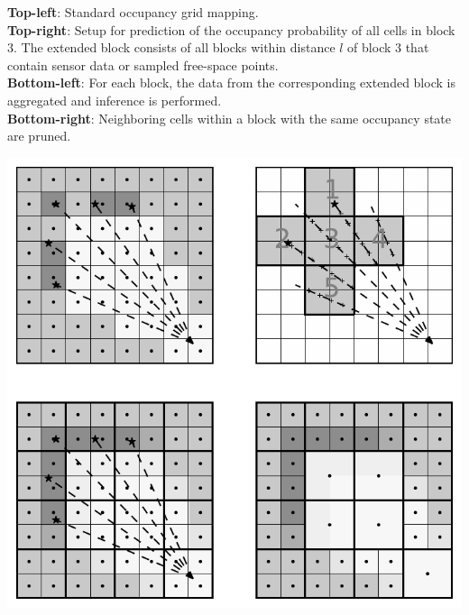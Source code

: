 \documentclass[portrait,final,archD,fontscale=0.477]{baposter}
\begin{document}
\begin{poster}
{\begin{multicols}{2}
\textbf{Top-left}: Standard occupancy grid mapping. \\

\textbf{Top-right}: Setup for prediction of the occupancy probability of all cells in block $3$. The extended block consists of all blocks within distance $l$ of block $3$ that contain sensor data or sampled free-space points. \\

\textbf{Bottom-left}: For each block, the data from the corresponding extended block is aggregated and inference is performed. \\

\textbf{Bottom-right}: Neighboring cells within a block with the same occupancy state are pruned.

\includegraphics[width=0.9\linewidth]{img/grid_octrees_predict}

\end{multicols}

}

\end{poster}
\end{document}
